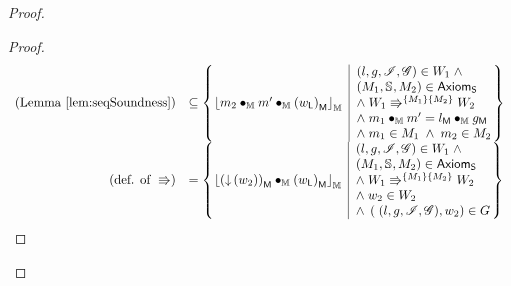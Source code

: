 \begin{lemma}
\begin{proof}
\begin{proof}
\[\begin{array}{r l}
	
	\left(\text{Lemma } \ref{lem:seqSoundness} \right)
	& \subseteq
	\left\{
	\hspace*{-0.15cm}
	\begin{array}{l | l}
		\reifyH{\h{2} \composeH \h{}' \composeH \heapPart{\left(\localPart{w}\right)}}
		&
		\hspace*{-0.15cm}
		\begin{array}{l}
			(l, g, \lmod, \gmod) \in W_1 \;\land\\ 
			(\Hp{1}, \seq{}, \Hp{2}) \in \AxiomsSeq \\
			\land\;\repartitions{W_1}{W_2}{\Hp{1}}{\Hp{2}}\\
			\land\; \h{1} \composeH \h{}' = \heapPart{l} \composeH \heapPart{g}\\
			\land\; \h{1} \in \Hp{1} \;\land\; \h{2} \in \Hp{2}
		\end{array}			
		\hspace*{-0.15cm}
	\end{array}
	\hspace*{-0.15cm}
	\right\}\\
	
	
	
	\left(\text{def. of } \Rrightarrow \right)
	& =
	\left\{
	\hspace*{-0.15cm}
	\begin{array}{l | l}
		\reifyH{ \heapPart{\left(\collapseW{w_2}\right)}  \composeH \heapPart{\left(\localPart{w}\right)}}
		&
		\hspace*{-0.15cm}
		\begin{array}{l}
			(l, g, \lmod, \gmod) \in W_1 \;\land\\ 
			(\Hp{1}, \seq{}, \Hp{2}) \in \AxiomsSeq \\
			\land\;\repartitions{W_1}{W_2}{\Hp{1}}{\Hp{2}}\\
			\land\; w_2 \in W_2\\
			\land\; \left(\;(l, g, \lmod{}, \gmod), w_2 \right) \in \guarantee
		\end{array}			
		\hspace*{-0.15cm}
	\end{array}
	\hspace*{-0.15cm}
	\right\}\\
	
	
	

\end{array}\]
\end{proof}
\end{proof}
\end{lemma}
